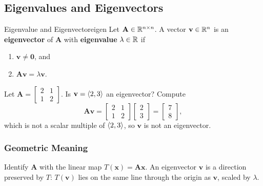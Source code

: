 \subsection{Eigenvalues and Eigenvectors}

\begin{definition}{Eigenvalue and Eigenvector}{eigen}
  Let $\mathbf{A} \in \mathbb{R}^{n \times n}$. A vector $\mathbf{v} \in \mathbb{R}^n$ is an \textbf{eigenvector} of $\mathbf{A}$ with \textbf{eigenvalue} $\lambda \in \mathbb{R}$ if
  \begin{enumerate}
    \item $\mathbf{v} \neq \mathbf{0}$, and
    \item $\mathbf{A}\mathbf{v} = \lambda \mathbf{v}$.
  \end{enumerate}
\end{definition}

\begin{example}
  Let $\mathbf{A} =
    \begin{bmatrix}
      2 & 1 \\ 1 & 2
    \end{bmatrix}
  $. Is $\mathbf{v} = \langle 2, 3 \rangle$ an eigenvector? Compute
  \[
    \mathbf{A}\mathbf{v} =
    \begin{bmatrix}
      2 & 1 \\ 1 & 2
    \end{bmatrix}
    \begin{bmatrix}
      2 \\ 3
    \end{bmatrix}
    =
    \begin{bmatrix}
      7 \\ 8
    \end{bmatrix}
    ,
  \]
  which is not a scalar multiple of $\langle 2, 3 \rangle$, so $\mathbf{v}$ is not an eigenvector.
\end{example}

\subsubsection{Geometric Meaning}

Identify $\mathbf{A}$ with the linear map $T(\mathbf{x}) = \mathbf{A}\mathbf{x}$. An eigenvector $\mathbf{v}$ is a direction preserved by $T$: $T(\mathbf{v})$ lies on the same line through the origin as $\mathbf{v}$, scaled by $\lambda$.

